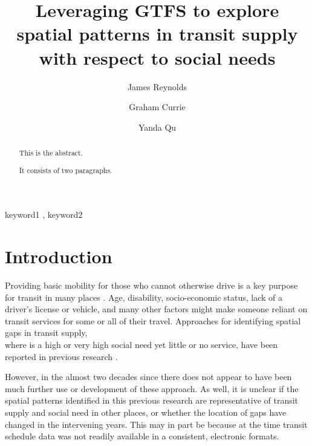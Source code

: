 \documentclass[preprint, 3p,
authoryear]{elsarticle} %
\begin{document}
\begin{frontmatter}

  \title{Leveraging GTFS to explore spatial patterns in transit supply
with respect to social needs}
    \author[Public Transport Research Group (PTRG)]{James Reynolds%
  }
    \author[Public Transport Research Group (PTRG)]{Graham Currie%
  }
    \author[Public Transport Research Group (PTRG)]{Yanda Qu%
  }
  
  \begin{abstract}
  This is the abstract.

  It consists of two paragraphs.
  \end{abstract}
    \begin{keyword}
    keyword1 \sep 
    keyword2
  \end{keyword}
  
 \end{frontmatter}

\section{Introduction}\label{introduction}

Providing basic mobility for those who cannot otherwise drive is a key
purpose for transit in many places \citep{Currie:2016aa}. Age,
disability, socio-economic status, lack of a driver's license or
vehicle, and many other factors might make someone reliant on transit
services for some or all of their travel. Approaches for identifying
spatial gaps in transit supply,\\
where is a high or very high social need yet little or no service, have
been reported in previous research
\citep{Currie2003Hobart, Currie2004Gap, Currie2007Identifying, currie2010identifying}.

However, in the almost two decades since there does not appear to have
been much further use or development of these approach. As well, it is
unclear if the spatial patterns identified in this previous research are
representative of transit supply and social need in other places, or
whether the location of gaps have changed in the intervening years. This
may in part be because at the time transit schedule data was not readily
available in a consistent, electronic formats.
\end{document}
